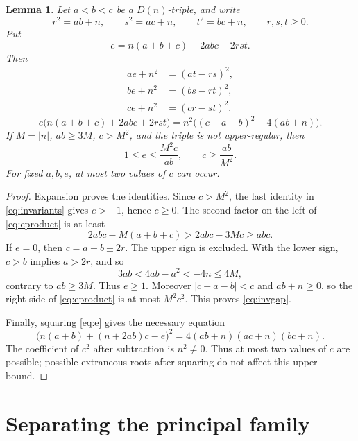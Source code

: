 \documentclass[11pt,a4paper]{article}
\numberwithin{equation}{section}
\newtheorem{lemma}[theorem]{Lemma}
\theoremstyle{remark}
\begin{document}
\begin{lemma}\label{lem:invariant}
Let $a<b<c$ be a $D(n)$-triple, and write
\[
r^2=ab+n,\qquad s^2=ac+n,\qquad t^2=bc+n,\qquad r,s,t\ge0.
\]
Put
\begin{equation}\label{eq:e}
e=n(a+b+c)+2abc-2rst.
\end{equation}
Then
\begin{equation}\label{eq:invariants}
\begin{aligned}
ae+n^2&=(at-rs)^2,\\
be+n^2&=(bs-rt)^2,\\
ce+n^2&=(cr-st)^2.
\end{aligned}
\end{equation}
\begin{equation}\label{eq:eproduct}
e\bigl(n(a+b+c)+2abc+2rst\bigr)
=n^2\bigl((c-a-b)^2-4(ab+n)\bigr).
\end{equation}
If $M=|n|$, $ab\ge3M$, $c>M^2$, and the triple is not upper-regular, then
\begin{equation}\label{eq:invgap}
1\le e\le\frac{M^2c}{ab},\qquad c\ge\frac{ab}{M^2}.
\end{equation}
For fixed $a,b,e$, at most two values of $c$ can occur.
\end{lemma}
\begin{proof}
Expansion proves the identities. Since $c>M^2$, the last identity in \eqref{eq:invariants} gives $e>-1$, hence $e\ge0$. The second factor on the left of \eqref{eq:eproduct} is at least
\[
2abc-M(a+b+c)>2abc-3Mc\ge abc.
\]
If $e=0$, then $c=a+b\pm2r$. The upper sign is excluded. With the lower sign, $c>b$ implies $a>2r$, and so
\[
3ab<4ab-a^2<-4n\le4M,
\]
contrary to $ab\ge3M$. Thus $e\ge1$. Moreover $|c-a-b|<c$ and $ab+n\ge0$, so the right side of \eqref{eq:eproduct} is at most $M^2c^2$. This proves \eqref{eq:invgap}.

Finally, squaring \eqref{eq:e} gives the necessary equation
\begin{equation}\label{eq:cquadratic}
\bigl(n(a+b)+(n+2ab)c-e\bigr)^2
=4(ab+n)(ac+n)(bc+n).
\end{equation}
The coefficient of $c^2$ after subtraction is $n^2\ne0$. Thus at most two values of $c$ are possible; possible extraneous roots after squaring do not affect this upper bound.
\end{proof}

\section{Separating the principal family}\label{sec:separation}
\end{document}
